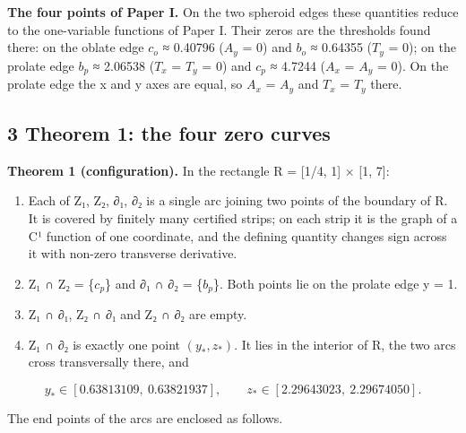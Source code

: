 \documentclass[
  11pt,
]{article}
\providecommand{\tightlist}{%
  \setlength{\itemsep}{0pt}\setlength{\parskip}{0pt}}
\begin{document}
\textbf{The four points of Paper I.} On the two spheroid edges these
quantities reduce to the one-variable functions of Paper I. Their zeros
are the thresholds found there: on the oblate edge \(c_{o}\) ≈ 0.40796
(\(A_{y}\) = 0) and \(b_{o}\) ≈ 0.64355 (\(T_{y}\) = 0); on the prolate
edge \(b_{p}\) ≈ 2.06538 (\(T_{x}\) = \(T_{y}\) = 0) and \(c_{p}\) ≈
4.7244 (\(A_{x}\) = \(A_{y}\) = 0). On the prolate edge the x and y axes
are equal, so \(A_{x}\) = \(A_{y}\) and \(T_{x}\) = \(T_{y}\) there.

\subsection{3 Theorem 1: the four zero curves}

\textbf{Theorem 1 (configuration).} In the rectangle R = {[}1/4, 1{]} ×
{[}1, 7{]}:

\begin{enumerate}
\def\labelenumi{\arabic{enumi}.}
\tightlist
\item
  Each of Z₁, Z₂, ∂₁, ∂₂ is a single arc joining two points of the
  boundary of R. It is covered by finitely many certified strips; on
  each strip it is the graph of a C¹ function of one coordinate, and the
  defining quantity changes sign across it with non-zero transverse
  derivative.
\item
  Z₁ ∩ Z₂ = \{\(c_{p}\)\} and ∂₁ ∩ ∂₂ = \{\(b_{p}\)\}. Both points lie
  on the prolate edge y = 1.
\item
  Z₁ ∩ ∂₁, Z₂ ∩ ∂₁ and Z₂ ∩ ∂₂ are empty.
\item
  Z₁ ∩ ∂₂ is exactly one point \((y_*, z_*)\). It lies in the interior
  of R, the two arcs cross transversally there, and
\end{enumerate}

\[
y_*\in[0.63813109,\ 0.63821937],\qquad z_*\in[2.29643023,\ 2.29674050].
\]

The end points of the arcs are enclosed as follows.
\end{document}
